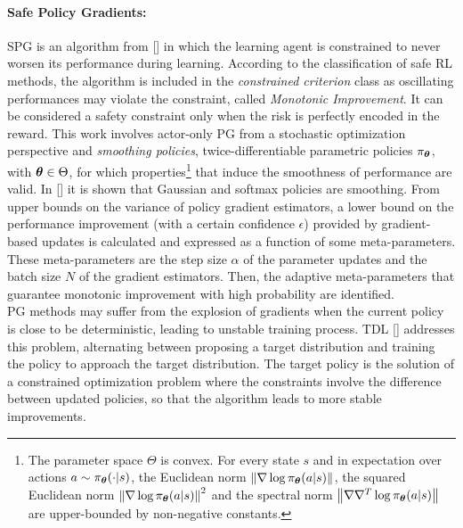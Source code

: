 \paragraph{Safe Policy Gradients:} \label{subsec:safepg}
\acf{SPG} is an algorithm from [\cite{papini2019}] in which the learning agent is constrained to never worsen its performance during learning. According to the classification of safe \ac{RL} methods, the algorithm is included in the \emph{constrained criterion} class as oscillating performances may violate the constraint, called \emph{Monotonic Improvement}. It can be considered a safety constraint only when the risk is perfectly encoded in the reward. This work involves actor-only \ac{PG} from a stochastic optimization perspective and \emph{smoothing policies}, \ie twice-differentiable parametric policies $\pi_{\boldsymbol{\theta}}$, with $\boldsymbol{\theta} \in \Theta$, for which properties\footnote{The parameter space $\Theta$ is convex. For every state $s$ and in expectation over actions $a \sim \pi_{\boldsymbol{\theta}}(\cdot|s)$, the Euclidean norm $\left\|\nabla \log \pi_{\boldsymbol{\theta}}(a|s)\right\|_{}$, the squared Euclidean norm $\left\|\nabla \log \pi_{\boldsymbol{\theta}}(a|s)\right\|_{}^2$ and the spectral norm $\left\|\nabla\nabla^T \log \pi_{\boldsymbol{\theta}}(a|s)\right\|_{}$ are upper-bounded by non-negative constants.} that induce the smoothness of performance are valid. In [\cite{papini2019}] it is shown that Gaussian and softmax policies are smoothing. From upper bounds on the variance of policy gradient estimators, a lower bound on the performance improvement (with a certain confidence $\epsilon$) provided by gradient-based updates is calculated and expressed as a function of some meta-parameters. These meta-parameters are the step size $\alpha$ of the parameter updates and the batch size $N$ of the gradient estimators. Then, the adaptive meta-parameters that guarantee monotonic improvement with high probability are identified.\\
\newline 
\ac{PG} methods may suffer from the explosion of gradients when the current policy is close to be deterministic, leading to unstable training process. \acf{TDL} [\cite{DBLP:journals/corr/abs-1905-11041}] addresses this problem, alternating between proposing a target distribution and training the policy to approach the target distribution. The target policy is the solution of a constrained optimization problem where the constraints involve the difference between updated policies, so that the algorithm leads to more stable improvements.